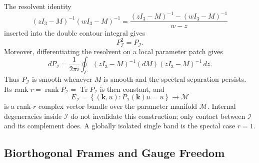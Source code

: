 \documentclass[11pt]{article}
\numberwithin{equation}{section}
\begin{document}
The resolvent identity
\begin{equation}
  (zI_3-M)^{-1}(wI_3-M)^{-1}
  =\frac{(zI_3-M)^{-1}-(wI_3-M)^{-1}}{w-z}
\end{equation}
inserted into the double contour integral gives
\begin{equation}
  P_{\mathcal I}^2=P_{\mathcal I}.
  \label{eq:projector_idempotency}
\end{equation}
Moreover, differentiating the resolvent on a local parameter patch gives
\begin{equation}
  dP_{\mathcal I}=\frac{1}{2\pi i}
  \oint_{\Gamma}
  (zI_3-M)^{-1}(dM)(zI_3-M)^{-1}\,dz .
  \label{eq:riesz_derivative}
\end{equation}
Thus $P_{\mathcal I}$ is smooth whenever $M$ is smooth and the spectral
separation persists. Its rank
$r=\operatorname{rank}P_{\mathcal I}=\operatorname{Tr}P_{\mathcal I}$ is
then constant, and
\begin{equation}
  E_{\mathcal I}=\left\{
  (\mathbf k,u):P_{\mathcal I}(\mathbf k)u=u
  \right\}
  \longrightarrow\mathcal M
  \label{eq:projector_bundle}
\end{equation}
is a rank-$r$ complex vector bundle over the parameter manifold
$\mathcal M$. Internal degeneracies inside $\mathcal I$ do not invalidate
this construction; only contact between $\mathcal I$ and its complement
does. A globally isolated single band is the special case $r=1$.

\subsection{Biorthogonal Frames and Gauge Freedom}
\end{document}
